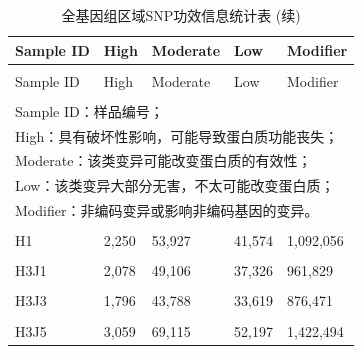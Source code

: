 \documentclass[
  a4paper,
  titlepage]{article}
\begin{document}
\begin{longtable}[t]{lllll}
\caption{\label{tab:effectstat-table}全基因组区域SNP功效信息统计表}\\
\toprule
Sample ID & High & Moderate & Low & Modifier\\
\midrule
\endfirsthead
\caption[]{\label{tab:effectstat-table}全基因组区域SNP功效信息统计表 (续)}\\
\toprule
Sample ID & High & Moderate & Low & Modifier\\
\midrule
\endhead
\hline
\endfoot
\bottomrule
\multicolumn{5}{l}{\rule{0pt}{1em}\textit{注：}}\\
\multicolumn{5}{l}{\rule{0pt}{1em}Sample ID：样品编号；}\\
\multicolumn{5}{l}{\rule{0pt}{1em}High：具有破坏性影响，可能导致蛋白质功能丧失；}\\
\multicolumn{5}{l}{\rule{0pt}{1em}Moderate：该类变异可能改变蛋白质的有效性；}\\
\multicolumn{5}{l}{\rule{0pt}{1em}Low：该类变异大部分无害，不太可能改变蛋白质；}\\
\multicolumn{5}{l}{\rule{0pt}{1em}Modifier：非编码变异或影响非编码基因的变异。}\\
\endlastfoot
\cellcolor{gray!6}{FJMS} & \cellcolor{gray!6}{5,421} & \cellcolor{gray!6}{119,411} & \cellcolor{gray!6}{89,142} & \cellcolor{gray!6}{2,703,739}\\
 
H1 & 2,250 & 53,927 & 41,574 & 1,092,056\\
 
\cellcolor{gray!6}{H3} & \cellcolor{gray!6}{1,730} & \cellcolor{gray!6}{40,638} & \cellcolor{gray!6}{30,358} & \cellcolor{gray!6}{831,475}\\
 
H3J1 & 2,078 & 49,106 & 37,326 & 961,829\\
 
\cellcolor{gray!6}{H3J2} & \cellcolor{gray!6}{1,850} & \cellcolor{gray!6}{44,888} & \cellcolor{gray!6}{34,678} & \cellcolor{gray!6}{970,572}\\
 
H3J3 & 1,796 & 43,788 & 33,619 & 876,471\\
 
\cellcolor{gray!6}{H3J4} & \cellcolor{gray!6}{2,031} & \cellcolor{gray!6}{47,169} & \cellcolor{gray!6}{36,593} & \cellcolor{gray!6}{954,269}\\
 
H3J5 & 3,059 & 69,115 & 52,197 & 1,422,494\\
 

\end{longtable}
\end{document}
